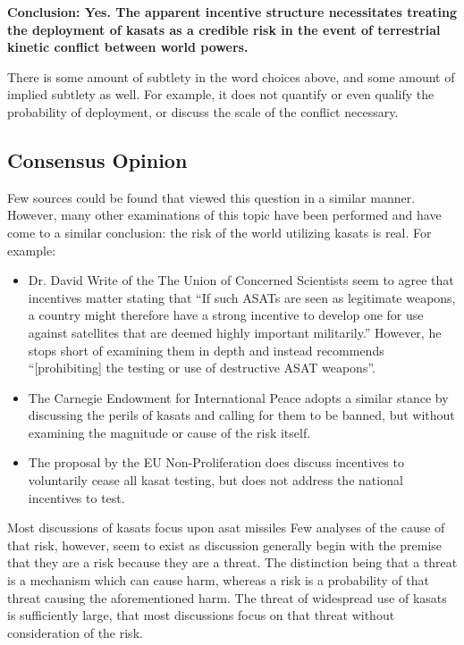 \begin{blockquote}
  {\bf Conclusion: Yes.  The apparent incentive structure necessitates
    treating the deployment of \acp{kasat} as a credible risk in the
    event of terrestrial kinetic conflict between world powers.}
\end{blockquote}

There is some amount of subtlety in the word choices above, and some
amount of implied subtlety as well.  For example, it does not quantify
or even qualify the probability of deployment, or discuss the scale of
the conflict necessary.


\subsection{Consensus Opinion}

Few sources could be found that viewed this question in a similar
manner.  However, many other examinations of this topic have been
performed and have come to a similar conclusion: the risk of the world
utilizing \acp{kasat} is real.  For example:

\begin{itemize}

\item Dr. David Write of the The Union of Concerned Scientists seem to
  agree that incentives matter stating that ``If such ASATs are seen
  as legitimate weapons, a country might therefore have a strong
  incentive to develop one for use against satellites that are deemed
  highly important militarily.''\cite[p2]{uocs-no-likey} However, he
  stops short of examining them in depth and instead recommends
  ``[prohibiting] the testing or use of destructive ASAT
  weapons''\cite[p2]{uocs-no-likey}.

\item The Carnegie Endowment for International Peace adopts a similar
  stance by discussing the perils of \acp{kasat} and calling for them
  to be banned, but without examining the magnitude or cause of the
  risk itself.\cite{carnegie-no-likey}

\item The proposal by the EU Non-Proliferation does discuss incentives
  to voluntarily cease all \ac{kasat} testing, but does not address
  the national incentives to test.\cite{eu-ban}

\end{itemize}

Most discussions of \acp{kasat} focus upon \ac{asat} missiles Few
analyses of the cause of that risk, however, seem to exist as
discussion generally begin with the premise that they are a risk
because they are a threat.  The distinction being that a threat is a
mechanism which can cause harm, whereas a risk is a probability of
that threat causing the aforementioned harm.  The threat of widespread
use of \acp{kasat} is sufficiently large, that most discussions focus
on that threat without consideration of the risk.

